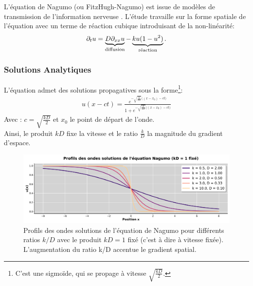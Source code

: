 \label{par:analyser_operateurs_nagumo}
L'équation de Nagumo (ou FitzHugh-Nagumo) est issue de modèles de transmission de l'information nerveuse \cite{FITZHUGH1961445}.
L'étude travaille sur la forme spatiale de l'équation \cite{keener1998mathematical} avec un terme de réaction cubique introduisant de la non-linéarité:
\begin{align}
    \partial_t u = \underbrace{D \partial_{xx} u}_{\text{diffusion}}
            - \underbrace{ku(1-u^2)}_{\text{réaction}}.
\end{align}
\subsubsection{Solutions Analytiques}
L'équation admet des solutions propagatives sous la forme\footnote{C'est une sigmoïde, qui se propage à vitesse $\sqrt{\frac{kD}{2}}$.}:%
\begin{align}
    \label{eq:sol_nagumo}
 u(x-ct) = \frac{e^{
 -\sqrt{\frac{k}{2D}} \bigl((x-x_0) - ct \bigr)}
 }
 {1 + e^{
 -\sqrt{\frac{k}{2D}} \bigl((x-x_0) - ct \bigr)}
 }
\end{align}
Avec : $c = \sqrt{\frac{kD}{2}}$ et $x_0$ le point de départ de l'onde.\\
Ainsi, le produit $kD$ fixe la vitesse et le ratio $\frac{k}{D}$ la magnitude du gradient d'espace.

\begin{figure}[htbp]
    \centering
    \includegraphics[width=\textwidth]{media/4_travail/2_nagumo/profils_nagumo.pdf}
    \caption{Profils des ondes solutions de l'équation de Nagumo pour différents ratios $k/D$ avec le produit $kD = 1$ fixé (c'est à dire à vitesse fixée). L'augmentation du ratio k/D accentue le gradient spatial.}
    \label{fig:profils_nagumo}
\end{figure}

